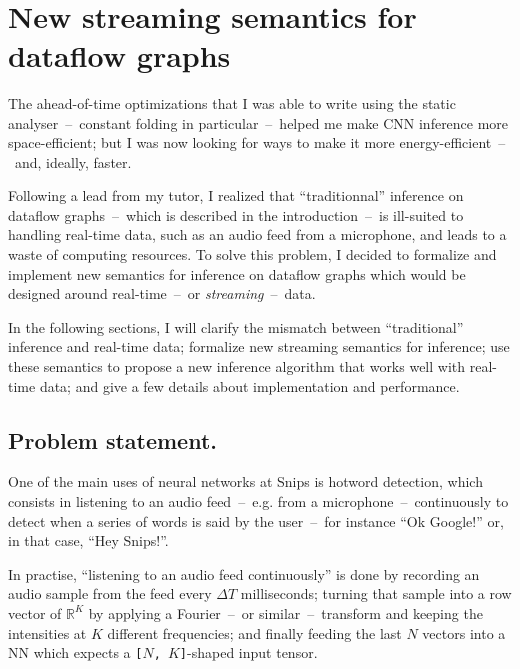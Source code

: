 \documentclass[11pt]{article}
\begin{document}
\bigskip
{}\\

\bigskip
\section{New streaming semantics for dataflow graphs}

The ahead-of-time optimizations that I was able to write using the static analyser~--~constant folding in particular~--~helped me make CNN inference more space-efficient; but I was now looking for ways to make it more energy-efficient~--~and, ideally, faster.

Following a lead from my tutor, I realized that ``traditionnal'' inference on dataflow graphs~--~which is described in the introduction~--~is ill-suited to handling real-time data, such as an audio feed from a microphone, and leads to a waste of computing resources. To solve this problem, I decided to formalize and implement new semantics for inference on dataflow graphs which would be designed around real-time~--~or \textit{streaming}~--~data.

In the following sections, I will clarify the mismatch between ``traditional'' inference and real-time data; formalize new streaming semantics for inference; use these semantics to propose a new inference algorithm that works well with real-time data; and give a few details about implementation and performance.

\subsection{Problem statement.}

One of the main uses of neural networks at Snips is hotword detection, which consists in listening to an audio feed~--~e.g. from a microphone~--~continuously to detect when a series of words is said by the user~--~for instance ``Ok Google!'' or, in that case, ``Hey Snips!''.

In practise, ``listening to an audio feed continuously'' is done by recording an audio sample from the feed every $\Delta T$ milliseconds; turning that sample into a row vector of $\mathbb{R}^K$ by applying a Fourier~--~or similar~--~transform and keeping the intensities at $K$ different frequencies; and finally feeding the last $N$ vectors into a NN which expects a \texttt{[$N$, $K$]}-shaped input tensor.
\end{document}
